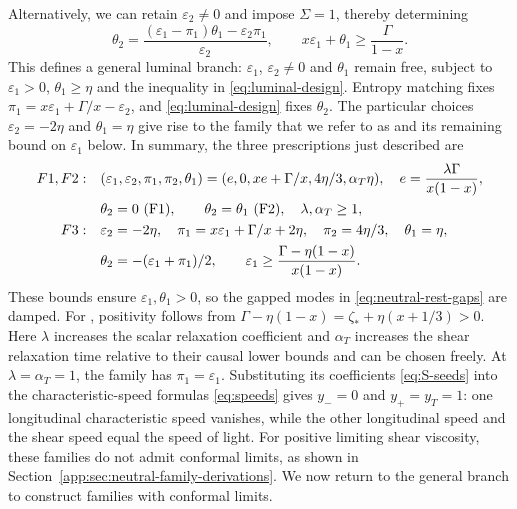 Alternatively, we can retain $\varepsilon_2\ne0$ and impose $\Sigma=1$, thereby determining
\begin{equation}\label{eq:luminal-design}
 \theta_2=\frac{(\varepsilon_1-\pi_1)\theta_1-\varepsilon_2\pi_1}{\varepsilon_2},\qquad
 x\varepsilon_1+\theta_1\geq\frac{\Gamma}{1-x}.
\end{equation}
This defines a general luminal branch: $\varepsilon_1$, $\varepsilon_2\ne0$
and $\theta_1$ remain free, subject to $\varepsilon_1>0$,
$\theta_1\geq\eta$ and the inequality in \eqref{eq:luminal-design}.
Entropy matching fixes $\pi_1=x\varepsilon_1+\Gamma/x-\varepsilon_2$,
and \eqref{eq:luminal-design} fixes $\theta_2$.
The particular choices $\varepsilon_2=-2\eta$ and $\theta_1=\eta$
give rise to the family that we refer to as  and its remaining bound on $\varepsilon_1$ below.
In summary, the three prescriptions just described are
\begin{align}
 \family{1},\family{2}:\quad &(\varepsilon_1,\varepsilon_2,\pi_1,\pi_2,\theta_1)
       =(e,0,xe+\Gamma/x,4\eta/3,\alpha_T\eta),
       \quad e=\frac{\lambda\Gamma}{x(1-x)},\nonumber\\
 &\theta_2=0\ \text{(\family{1})},\qquad \theta_2=\theta_1\ \text{(\family{2})},
       \quad\lambda,\alpha_T\geq1,\nonumber\\
 \family{3}:\quad &\varepsilon_2=-2\eta,\quad \pi_1=x\varepsilon_1+\Gamma/x+2\eta,
       \quad \pi_2=4\eta/3,\quad \theta_1=\eta,\nonumber\\
 &\theta_2=-(\varepsilon_1+\pi_1)/2,\qquad
       \varepsilon_1\geq\frac{\Gamma-\eta(1-x)}{x(1-x)}.\label{eq:S-seeds}
\end{align}
These bounds ensure $\varepsilon_1,\theta_1>0$, so the gapped modes
in \eqref{eq:neutral-rest-gaps} are damped. For , positivity
follows from $\Gamma-\eta(1-x)=\zeta_*+\eta(x+1/3)>0$.
Here $\lambda$ increases the scalar relaxation coefficient and
$\alpha_T$ increases the shear relaxation time relative to their causal
lower bounds and can be chosen freely. At $\lambda=\alpha_T=1$, the family  has
$\pi_1=\varepsilon_1$. Substituting its coefficients \eqref{eq:S-seeds}
into the characteristic-speed formulas \eqref{eq:speeds} gives
$y_-=0$ and $y_+=y_T=1$: one longitudinal characteristic speed vanishes,
while the other longitudinal speed and the shear speed equal the speed of light.
For positive limiting shear viscosity, these families do not admit
conformal limits, as shown in Section~\ref{app:sec:neutral-family-derivations}.
We now return to the general branch to construct families with conformal limits.

